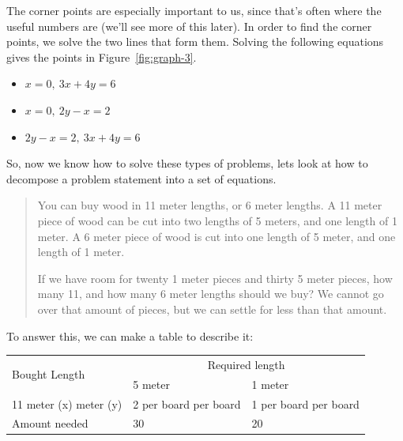 The corner points are especially important to us, since that's often where the
useful numbers are (we'll see more of this later). In order to find the corner
points, we solve the two lines that form them. Solving the following equations
gives the points in Figure~\ref{fig:graph-3}.

\begin{mymulticols}
  \begin{itemize}
    \item $x = 0,~3x + 4y = 6$
    \item $x = 0,~2y - x = 2$
    \item $2y - x = 2,~3x + 4y = 6$
  \end{itemize}
\end{mymulticols}

So, now we know how to solve these types of problems, lets look at how to
decompose a problem statement into a set of equations.

\begin{quote}

  You can buy wood in 11 meter lengths, or 6 meter lengths. A 11 meter piece of
  wood can be cut into two lengths of 5 meters, and one length of 1 meter. A 6
  meter piece of wood is cut into one length of 5 meter, and one length of 1
  meter.

  If we have room for twenty 1 meter pieces and thirty 5 meter pieces, how many
  11, and how many 6 meter lengths should we buy? We cannot go over that amount
  of pieces, but we can settle for less than that amount.

\end{quote}

To answer this, we can make a table to describe it:

\begin{center}
  \begin{tabular} {|p{3cm}|p{2cm}|p{2cm}|}
    \hline
    \multirow{2}{*}{Bought Length} & \multicolumn{2}{c|}{Required length}\\
    \cline{2-3}
    & 5 meter & 1 meter\\ \hline
    11 meter (x)\newline 6 meter (y) & 2 per board\newline 1 per board & 1 per
    board\newline 1 per board\\ \hline
    Amount needed & 30 & 20\\ \hline
  \end{tabular}
\end{center}

